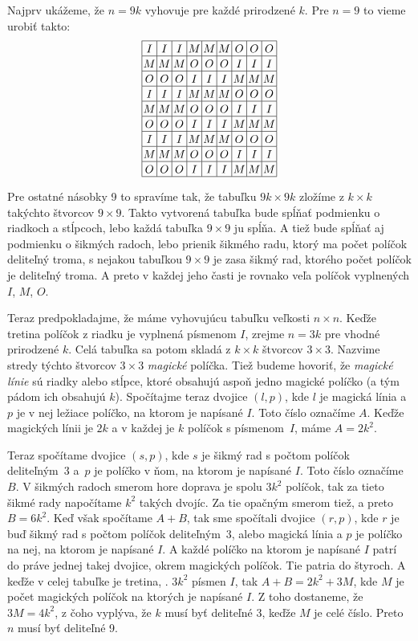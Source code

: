 {%
Najprv ukážeme, že $n=9k$ vyhovuje pre každé prirodzené $k$. Pre $n=9$ to vieme urobiť takto:
$$
\vbox{\let\\=\cr\everycr{\noalign{\hrule}}\offinterlineskip
\def\strut{\vrule width 0pt height1em depth.3em\relax}
\halign{\vrule\strut\hbox to 1.3em{\hss$#$\hss}\vrule&&\hbox to 1.3em{\hss$#$\hss}\vrule\cr
I & I & I & M & M & M & O & O & O \\
M & M & M & O & O & O & I & I & I \\
O & O & O & I & I & I & M & M & M \\
I & I & I & M & M & M & O & O & O \\
M & M & M & O & O & O & I & I & I \\
O & O & O & I & I & I & M & M & M \\
I & I & I & M & M & M & O & O & O \\
M & M & M & O & O & O & I & I & I \\
O & O & O & I & I & I & M & M & M \\
}}
$$

Pre ostatné násobky 9 to spravíme tak, že tabuľku $9k\times 9k$ zložíme z $k\times k$ takýchto štvorcov $9\times 9$. Takto vytvorená tabuľka bude spĺňať podmienku o riadkoch a stĺpcoch, lebo každá tabuľka $9\times 9$ ju spĺňa. A tiež bude spĺňať aj podmienku o šikmých radoch, lebo prienik šikmého radu, ktorý ma počet políčok deliteľný troma, s nejakou tabuľkou $9\times 9$ je zasa šikmý rad, ktorého počet políčok je deliteľný troma. A preto v každej jeho časti je rovnako veľa políčok vyplnených $I$, $M$, $O$.

Teraz predpokladajme, že máme vyhovujúcu tabuľku veľkosti $n\times n$. Keďže tretina políčok z riadku je vyplnená písmenom $I$, zrejme $n=3k$ pre vhodné prirodzené $k$. Celá tabuľka sa potom skladá z $k\times k$ štvorcov $3\times 3$. Nazvime stredy týchto štvorcov $3\times 3$ {\it magické\/} políčka. Tiež budeme hovoriť, že {\it magické línie\/} sú riadky alebo stĺpce, ktoré obsahujú aspoň jedno magické políčko (a tým pádom ich obsahujú $k$). Spočítajme teraz dvojice $(l,p)$, kde $l$ je magická línia a $p$ je v nej ležiace políčko, na ktorom je napísané $I$. Toto číslo označíme $A$. Keďže magických línii je $2k$ a v každej je $k$ políčok s písmenom~$I$, máme $A=2k^2$.

Teraz spočítame dvojice $(s,p)$, kde $s$ je šikmý rad s počtom políčok deliteľným~3 a~$p$ je políčko v ňom, na ktorom je napísané $I$. Toto číslo označíme $B$. V šikmých radoch smerom hore doprava je spolu $3k^2$ políčok, tak za tieto šikmé rady napočítame $k^2$ takých dvojíc. Za tie opačným smerom tiež, a preto $B=6k^2$.
Keď však spočítame $A+B$, tak sme spočítali dvojice $(r,p)$, kde $r$ je buď šikmý rad s počtom políčok deliteľným~3, alebo magická línia a $p$ je políčko na nej, na ktorom je napísané $I$. A každé políčko na ktorom je napísané $I$ patrí do práve jednej takej dvojice, okrem magických políčok. Tie patria do štyroch. A keďže v celej tabuľke je tretina, \tj. $3k^2$ písmen $I$, tak $A+B=2k^2+3M$, kde $M$ je počet magických políčok na ktorých je napísané $I$. Z toho dostaneme, že $3M=4k^2$, z čoho vyplýva, že $k$ musí byť deliteľné 3, keďže $M$ je celé číslo. Preto $n$ musí byť deliteľné 9.

}
